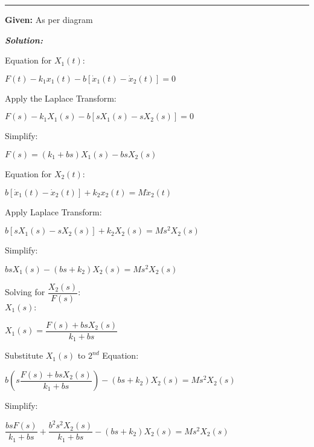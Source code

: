 \documentclass[11pt,letterpaper]{article}
\begin{document}
\rule{\textwidth}{1pt}

\noindent\textbf{Given:} As per diagram

\vspace{12pt}
\noindent\textit{\textbf{Solution:}}

\vspace{12pt}

Equation for $X_1(t)$:\\
\begin{center}
	$F(t)-k_1x_1(t)-b[\dot{x}_1(t)-\dot{x}_2(t)]=0$\\[12pt]
\end{center}
Apply the Laplace Transform:\\
\begin{center}
	$F(s)-k_1X_1(s)-b[sX_1(s)-sX_2(s)]=0$\\
\end{center}
Simplify:\\
\begin{center}
	$F(s)=(k_1+bs)X_1(s)-bsX_2(s)$\\
\end{center}
Equation for $X_2(t)$:\\
\begin{center}
	$b[\dot{x}_1(t)-\dot{x}_2(t)]+k_2x_2(t)=M\ddot{x}_2(t)$\\
\end{center}
Apply Laplace Transform:\\
\begin{center}
	$b[sX_1(s)-sX_2(s)]+k_2X_2(s)=Ms^2X_2(s)$\\
\end{center}
Simplify:\\
\begin{center}
	$bsX_1(s)-(bs+k_2)X_2(s)=Ms^2X_2(s)$\\
\end{center}
Solving for $\dfrac{X_2(s)}{F(s)}:$\\[12pt]
$X_1(s):$\\
\begin{center}
	$X_1(s)=\dfrac{F(s)+bsX_2(s)}{k_1+bs}$
\end{center}
Substitute $X_1(s)$ to $2^{nd}$ Equation:\\
\begin{center}
	$b\left(s\dfrac{F(s)+bsX_2(s)}{k_1+bs}\right)-(bs+k_2)X_2(s)=Ms^2X_2(s)$
\end{center}
Simplify:\\
\begin{center}
	$\dfrac{bsF(s)}{k_1+bs}+\dfrac{b^2s^2X_2(s)}{k_1+bs}-(bs+k_2)X_2(s)=Ms^2X_2(s)$
\end{center}
\end{document}
